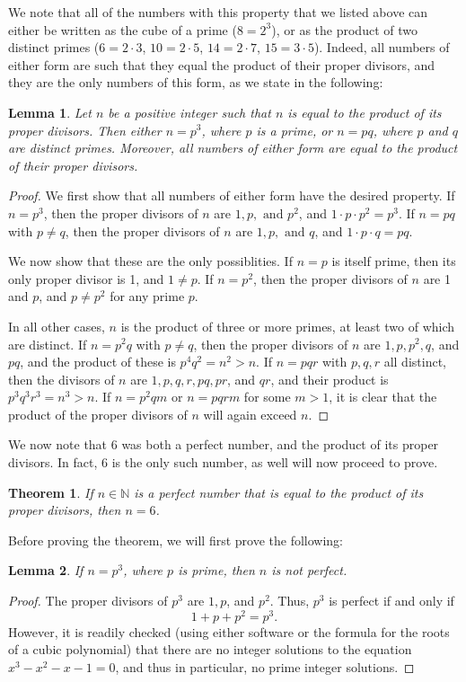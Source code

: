 \documentclass[letterpaper,12pt]{article}
\newtheorem{theorem}{Theorem}
\newtheorem{lemma}{Lemma}
\theoremstyle{definition}
\newcommand{\N}{\mathbb{N}}
\begin{document}
We note that all of the numbers with this property that we listed above can either be written as the cube of a prime ($8=2^3$), or as the product of two distinct primes ($6=2\cdot 3$, $10=2\cdot 5$, $14=2\cdot 7$, $15=3\cdot 5$). Indeed, all numbers of either form are such that they equal the product of their proper divisors, and they are the only numbers of this form, as we state in the following:
\begin{lemma}\label{b}
 Let $n$ be a positive integer such that $n$ is equal to the product of its proper divisors. Then either $n=p^3$, where $p$ is a prime, or $n=pq$, where $p$ and $q$ are distinct primes. Moreover, all numbers of either form are equal to the product of their proper divisors.
\end{lemma}
\begin{proof}
 We first show that all numbers of either form have the desired property. If $n=p^3$, then the proper divisors of $n$ are $1, p, \text{ and } p^2$, and $1\cdot p\cdot p^2 = p^3$. If $n=pq$ with $p\neq q$, then the proper divisors of $n$ are $1, p, \text{ and } q$, and $1\cdot p\cdot q = pq$.

 We now show that these are the only possiblities. If $n=p$ is itself prime, then its only proper divisor is 1, and $1\neq p$. If $n=p^2$, then the proper divisors of $n$ are 1 and $p$, and $p\neq p^2$ for any prime $p$.

 In all other cases, $n$ is the product of three or more primes, at least two of which are distinct. If $n=p^2q$ with $p\neq q$, then the proper divisors of $n$ are $1,p,p^2,q$, and $pq$, and the product of these is $p^4q^2 = n^2> n$. If $n=pqr$ with $p,q,r$ all distinct, then the divisors of $n$ are $1,p,q,r,pq,pr$, and $qr$, and their product is $p^3q^3r^3=n^3> n$. If $n=p^2qm$ or $n=pqrm$ for some $m>1$, it is clear that the product of the proper divisors of $n$ will again exceed $n$.
\end{proof}
We now note that 6 was both a perfect number, and the product of its proper divisors. In fact, 6 is the only such number, as well will now proceed to prove.
\begin{theorem}\label{a}
 If $n\in \N$ is a perfect number that is equal to the product of its proper divisors, then $n=6$.
\end{theorem}
Before proving the theorem, we will first prove the following:
\begin{lemma}\label{c}
 If $n=p^3$, where $p$ is prime, then $n$ is not perfect.
\end{lemma}
\begin{proof}
 The proper divisors of $p^3$ are $1, p$, and $p^2$. Thus, $p^3$ is perfect if and only if
\[
 1+p+p^2=p^3.
\]
However, it is readily checked (using either software or the formula for the roots of a cubic polynomial) that there are no integer solutions to the equation $x^3-x^2-x-1=0$, and thus in particular, no prime integer solutions.
\end{proof}
\end{document}
